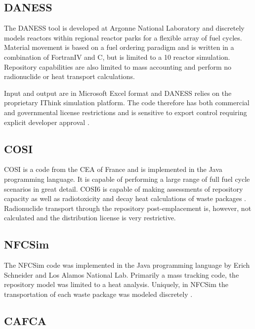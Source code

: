 \subsection{DANESS} 

The \gls{DANESS} tool is developed at Argonne National Laboratory and
discretely models reactors within regional reactor parks for a flexible array 
of fuel cycles. Material movement is based on a fuel ordering paradigm and is 
written in a combination of FortranIV and C, but is limited to a 10 reactor 
simulation.  Repository capabilities are also limited to mass accounting and 
perform no radionuclide or heat transport calculations. 

Input and output are in Microsoft Excel format and \gls{DANESS} relies on the 
proprietary IThink simulation platform. The code therefore has both commercial 
and governmental license restrictions and is sensitive to export control 
requiring explicit developer approval 
\cite{yacout_daness_2011,van_den_durpel_daness:_2006}. 



\subsection{COSI}

\gls{COSI} is a code from the \gls{CEA} of France and is implemented in the Java programming 
language. It is capable of performing a large range of full fuel cycle 
scenarios in great detail. COSI6 is capable of making assessments of repository capacity as 
well as radiotoxicity and decay heat calculations of waste packages
\cite{boucher_international_2010}. Radionuclide transport through the repository 
post-emplacement is, however, not calculated and the distribution license is 
very restrictive.


\subsection{NFCSim}

The \gls{NFCSim} code was implemented in the Java programming language by Erich 
Schneider and Los Alamos National Lab. Primarily a mass tracking code, the 
repository model was limited to a heat analysis. Uniquely, in NFCSim the 
transportation of each waste package was modeled discretely 
\cite{schneider_nfcsim_2004}.

\subsection{CAFCA}

